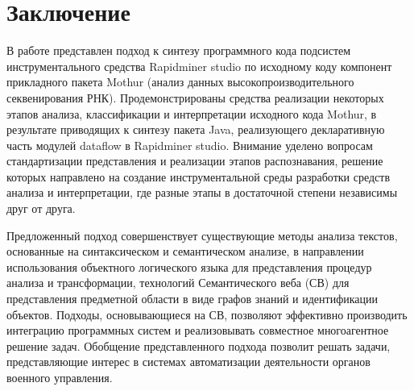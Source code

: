 \documentclass[12pt]{article}
\begin{document}
\section*{Заключение}

В работе представлен подход к синтезу программного кода подсистем
инструментального средства Rapidminer studio по исходному коду компонент
прикладного пакета Mothur (анализ данных высокопроизводительного
секвенирования РНК). Продемонстрированы средства реализации некоторых этапов
анализа, классификации и интерпретации исходного кода Mothur, в
результате приводящих к синтезу пакета Java, реализующего декларативную
часть модулей dataflow в Rapidminer studio. Внимание уделено вопросам
стандартизации представления и реализации этапов распознавания, решение
которых направлено на создание инструментальной среды разработки средств
анализа и интерпретации, где разные этапы в достаточной степени
независимы друг от друга.

Предложенный подход совершенствует существующие методы анализа текстов, основанные на синтаксическом и семантическом анализе, в направлении использования объектного логического языка для представления процедур анализа и трансформации, технологий Семантического веба (СВ) для представления предметной области в виде графов знаний и идентификации объектов.  Подходы, основывающиеся на СВ, позволяют эффективно производить интеграцию программных систем и реализовывать совместное многоагентное решение задач.  Обобщение представленного подхода позволит решать задачи, представляющие
интерес в системах автоматизации деятельности органов военного управления.
\end{document}
